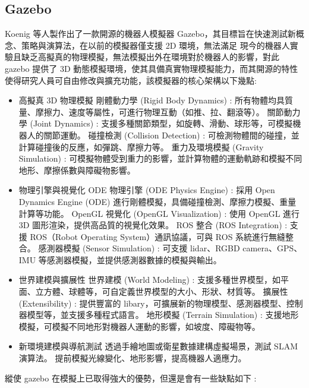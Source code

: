 \subsection{Gazebo}
Koenig 等人製作出了一款開源的機器人模擬器 Gazebo\cite{Koenig2004Gazebo}，其目標旨在快速測試新概念、策略與演算法，在以前的模擬器僅支援 2D 環境，無法滿足
現今的機器人實驗且缺乏高擬真的物理模擬，無法模擬出外在環境對於機器人的影響，對此 gazebo 提供了 3D 動態模擬環境，使其具備真實物理模擬能力，而其開源的特性
使得研究人員可自由修改與擴充功能，該模擬器的核心架構以下幾點:
\begin{itemize}
      \item 高擬真 3D 物理模擬
            \subitem 剛體動力學 (Rigid Body Dynamics) : 所有物體均具質量、摩擦力、速度等屬性，可進行物理互動（如推、拉、翻滾等）。
            \subitem 關節動力學 (Joint Dynamics) : 支援多種關節類型，如旋轉、滑動、球形等，可模擬機器人的關節運動。
            \subitem 碰撞檢測 (Collision Detection) : 可檢測物體間的碰撞，並計算碰撞後的反應，如彈跳、摩擦力等。
            \subitem 重力及環境模擬 (Gravity Simulation) : 可模擬物體受到重力的影響，並計算物體的運動軌跡和模擬不同地形、摩擦係數與障礙物影響。
      \item 物理引擎與視覺化
            \subitem ODE 物理引擎 (ODE Physics Engine) : 採用 Open Dynamics Engine (ODE) 進行剛體模擬，具備碰撞檢測、摩擦力模擬、重量計算等功能。
            \subitem OpenGL 視覺化 (OpenGL Visualization) : 使用 OpenGL 進行 3D 圖形渲染，提供高品質的視覺化效果。
            \subitem ROS 整合 (ROS Integration) : 支援 ROS（Robot Operating System）通訊協議，可與 ROS 系統進行無縫整合。
            \subitem 感測器模擬 (Sensor Simulation) :
            可支援 lidar、RGBD camera、GPS、IMU 等感測器模擬，並提供感測器數據的模擬與輸出。
      \item 世界建模與擴展性
            \subitem 世界建模 (World Modeling) : 支援多種世界模型，如平面、立方體、球體等，可自定義世界模型的大小、形狀、材質等。
            \subitem 擴展性 (Extensibility) : 提供豐富的 libary，可擴展新的物理模型、感測器模型、控制器模型等，並支援多種程式語言。
            \subitem 地形模擬 (Terrain Simulation) : 支援地形模擬，可模擬不同地形對機器人運動的影響，如坡度、障礙物等。
      \item 新環境建模與導航測試
            \subitem 透過手繪地圖或衛星數據建構虛擬場景，測試 SLAM 演算法。
            \subitem 提前模擬光線變化、地形影響，提高機器人適應力。
\end{itemize}
縱使 gazebo 在模擬上已取得強大的優勢，但還是會有一些缺點如下 :
